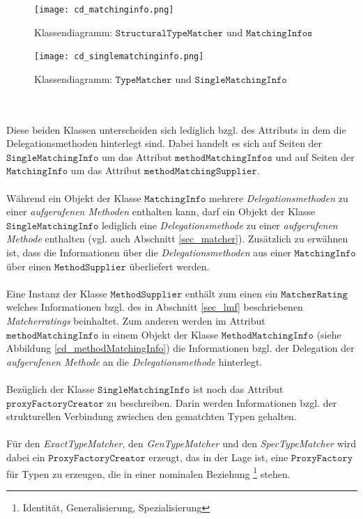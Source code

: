 \begin{figure}[h!]
\texttt{[image: cd\_matchinginfo.png]}
\caption{Klassendiagramm: $\texttt{StructuralTypeMatcher}$ und $\texttt{MatchingInfos}$}
\label{fig_cdMatchingInfo}
\end{figure}
\begin{figure}[h!]
\texttt{[image: cd\_singlematchinginfo.png]}
\caption{Klassendiagramm: $\texttt{TypeMatcher}$ und $\texttt{SingleMatchingInfo}$}
\label{fig_cdSingleMatchingInfo}
\end{figure}
\noindent
\\\\
Diese beiden Klassen unterscheiden sich lediglich bzgl. des Attributs in dem die Delegationsmethoden hinterlegt sind. Dabei handelt es sich auf Seiten der $\texttt{SingleMatchingInfo}$ um das Attribut $\texttt{methodMatchingInfos}$ und auf Seiten der $\texttt{MatchingInfo}$ um das Attribut \linebreak$\texttt{methodMatchingSupplier}$. 
\\\\
Während ein Objekt der Klasse $\texttt{MatchingInfo}$ mehrere \emph{Delegationsmethoden} zu einer \emph{aufgerufenen Methoden} enthalten kann, darf ein Objekt der Klasse $\texttt{SingleMatchingInfo}$ lediglich eine \emph{Delegationsmethode} zu einer \emph{aufgerufenen Methode} enthalten (vgl. auch Abschnitt \ref{sec_matcher}). Zusätzlich zu erwähnen ist, dass die Informationen über die \emph{Delegationsmethoden} aus einer $\texttt{MatchingInfo}$ über einen $\texttt{MethodSupplier}$ überliefert werden.
\\\\
Eine Instanz der Klasse $\texttt{MethodSupplier}$ enthält zum einen ein $\texttt{MatcherRating}$ welches Informationen bzgl. des in Abschnitt \ref{sec_lmf} beschriebenen \emph{Matcherratings} beinhaltet. Zum anderen werden im Attribut $\texttt{methodMatchingInfo}$ in einem Objekt der Klasse $\texttt{MethodMatchingInfo}$ (siehe Abbildung \ref{cd_methodMatchingInfo}) die Informationen bzgl. der Delegation der \emph{aufgerufenen Methode} an die \emph{Delegationsmethode} hinterlegt. 
\\\\
Bezüglich der Klasse $\texttt{SingleMatchingInfo}$ ist noch das Attribut $\texttt{proxyFactoryCreator}$ zu beschreiben. Darin werden Informationen bzgl. der strukturellen Verbindung zwischen den gematchten Typen gehalten. 
\\\\
Für den \emph{ExactTypeMatcher}, den \emph{GenTypeMatcher} und den \emph{SpecTypeMatcher} wird dabei ein $\texttt{ProxyFactoryCreator}$ erzeugt, das in der Lage ist, eine $\texttt{ProxyFactory}$ für Typen zu erzeugen, die in einer nominalen Beziehung \footnote{Identität, Generalisierung, Spezialisierung} stehen. 
